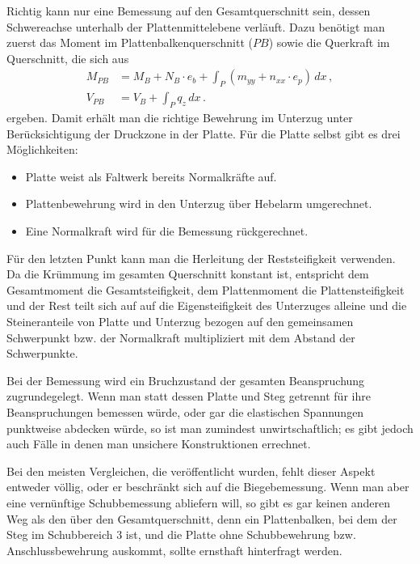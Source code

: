 Richtig kann nur eine Bemessung auf den Gesamtquerschnitt sein, dessen Schwereachse unterhalb der Plattenmittelebene verl\"{a}uft. Dazu ben\"{o}tigt man zuerst das Moment im Plattenbalkenquerschnitt ($PB$) sowie die Querkraft im Querschnitt, die sich aus
\begin{align}
M_{PB} &= M_B + N_B \cdot e_b + \int_{P} (m_{yy}+n_{xx}\cdot
e_p)\, dx \,,\\
V_{PB} &= V_B + \int_P q_z\, dx \,.
\end{align}
ergeben. Damit erh\"{a}lt man die richtige Bewehrung im Unterzug unter Ber\"{u}cksichtigung der Druckzone
in der Platte. F\"{u}r die Platte selbst gibt es drei M\"{o}glichkeiten:\\

\begin{itemize}
\item Platte weist als Faltwerk bereits Normalkr\"{a}fte auf.
\item Plattenbewehrung wird in den Unterzug \"{u}ber Hebelarm umgerechnet.
\item Eine Normalkraft wird f\"{u}r die Bemessung r\"{u}ckgerechnet.
\end{itemize}
F\"{u}r den letzten Punkt kann man die Herleitung der Reststeifigkeit verwenden. Da die Kr\"{u}mmung im gesamten Querschnitt konstant ist, entspricht dem Gesamtmoment die Gesamtsteifigkeit, dem Plattenmoment die Plattensteifigkeit und der Rest teilt sich auf auf die Eigensteifigkeit des Unterzuges alleine und die Steineranteile von Platte und Unterzug bezogen auf den gemeinsamen Schwerpunkt bzw. der Normalkraft multipliziert mit dem Abstand der Schwerpunkte.

Bei der Bemessung wird ein Bruchzustand der gesamten Beanspruchung zugrundegelegt. Wenn man statt dessen Platte und Steg getrennt f\"{u}r ihre Beanspruchungen bemessen w\"{u}rde, oder gar die elastischen Spannungen punktweise abdecken w\"{u}rde, so ist man zumindest unwirtschaftlich; es gibt jedoch auch F\"{a}lle in denen man unsichere Konstruktionen errechnet.

Bei den meisten Vergleichen, die ver\"{o}ffentlicht wurden, fehlt dieser Aspekt entweder v\"{o}llig, oder er beschr\"{a}nkt sich auf die Biegebemessung. Wenn man aber eine vern\"{u}nftige Schubbemessung abliefern will, so gibt es gar keinen anderen Weg als den \"{u}ber den Gesamtquerschnitt, denn ein Plattenbalken, bei dem der Steg im Schubbereich 3 ist, und die Platte ohne Schubbewehrung bzw. Anschlussbewehrung auskommt, sollte ernsthaft hinterfragt werden.

